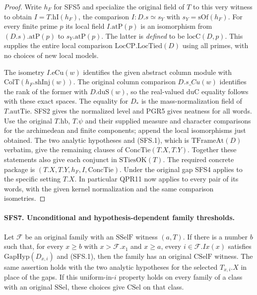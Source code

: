 \begin{proof}
Write $h_F$ for SFS5 and specialize the original field of $T$ to
this very witness to obtain $I=T.\mathrm{hI}(h_F)$, the
comparison $I:D.s\simeq s_Y$ with $s_Y=\mathrm{sOf}(h_F)$.
For every finite prime $p$ its local field $I.\mathrm{atP}(p)$
is an isomorphism from $(D.s).\mathrm{atP}(p)$ to
$s_Y.\mathrm{atP}(p)$. The latter is \emph{defined} to be
$\mathrm{locC}(D,p)$. This supplies the entire local comparison
$\mathrm{LocCP.LocTied}(D)$ using all primes, with no choices
of new local models.

The isometry $I.\mathrm{eCu}(w)$ identifies the given abstract
column module with $\mathrm{ColT}(h_F.\mathrm{shInj}(w))$.
The original column comparison $D.s\_Cu(w)$ identifies the rank
of the former with $D.\mathrm{duS}(w)$, so the real-valued
$\mathrm{duC}$ equality follows with these exact spaces.
The equality for $D_\ast$ is the mass-normalization field of
$T.\mathrm{autTie}$. SFS2 gives the normalized level and PGR5
gives neatness for all words. Use the original $T.\mathrm{hb}$,
$T.\psi$ and their supplied measure and character comparisons for
the archimedean and finite components; append the local isomorphisms
just obtained. The two analytic hypotheses and (SFS.1), which is
$\mathrm{TFrameAt}(D)$ verbatim, give the remaining clauses of
$\mathrm{ConcTie}(T.X,T.Y)$. Together these statements also
give each conjunct in $\mathrm{STiesOK}(T)$. The required
concrete package is $(T.X,T.Y,h_F,I,\mathrm{ConcTie})$.
Under the original gap SFS4 applies to the specific setting $T.X$.
In particular QPR11 now applies to every pair of its words, with
the given kernel normalization and the same comparison isometries.
\end{proof}

\paragraph{SFS7. Unconditional and hypothesis-dependent family thresholds.}
\label{claim:SFS7}
Let $\mathcal F$ be an original family with an $\mathrm{SSelF}$
witness $(a,T)$. If there is a number $b$ such that, for every
$x\ge b$ with $x>\mathcal F.x_1$ and $x\ge a$, every
$i\in\mathcal F.Ix(x)$ satisfies $\mathrm{GapHyp}(D_{x,i})$
and (SFS.1), then the family has an original $\mathrm{CSelF}$
witness. The same assertion holds with the two analytic
hypotheses for the selected $T_{x,i}.X$ in place of the gaps.
If this uniform-in-$i$ property holds on every family of a
class with an original $\mathrm{SSel}$, these choices give
$\mathrm{CSel}$ on that class.

